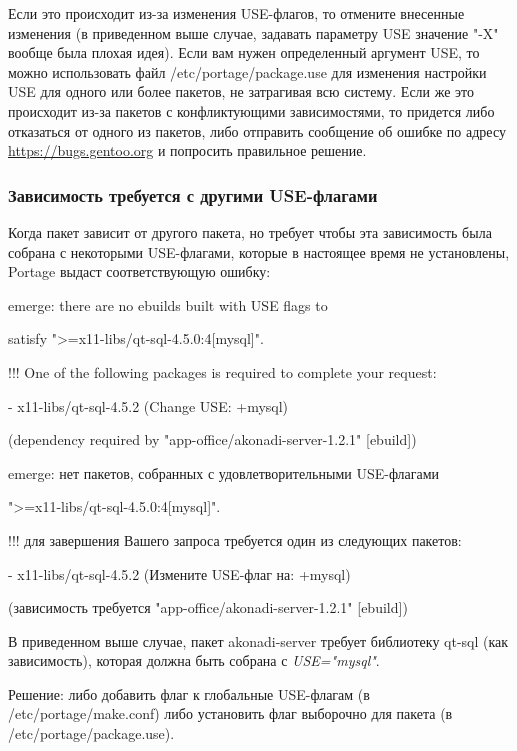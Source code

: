 \documentclass[10pt]{book}
\begin{document}
Если это происходит из-за изменения USE-флагов, то отмените внесенные изменения (в приведенном выше случае, задавать параметру USE значение "-X" вообще была плохая идея). Если вам нужен определенный аргумент USE, то можно использовать файл  /etc/portage/package.use для изменения настройки USE для одного или более пакетов, не затрагивая всю систему. Если же это происходит из-за пакетов с конфликтующими зависимостями, то придется либо отказаться от одного из пакетов, либо отправить сообщение об ошибке по адресу \href{https://bugs.gentoo.org}{https://bugs.gentoo.org} и попросить правильное решение.

\subsubsection{Зависимость требуется с другими USE-флагами}

Когда пакет зависит от другого пакета, но требует чтобы эта зависимость была собрана с некоторыми USE-флагами, которые в настоящее время не установлены, Portage выдаст соответствующую ошибку:

 \begin{tcolorbox}
emerge: there are no ebuilds built with USE flags to

satisfy ">=x11-libs/qt-sql-4.5.0:4[mysql]".

!!! One of the following packages is required to complete your request:

- x11-libs/qt-sql-4.5.2 (Change USE: +mysql)

(dependency required by "app-office/akonadi-server-1.2.1" [ebuild])
\end{tcolorbox}
 \begin{tcolorbox}
emerge: нет пакетов, собранных с удовлетворительными USE-флагами 

">=x11-libs/qt-sql-4.5.0:4[mysql]".

!!! для завершения Вашего запроса требуется один из следующих пакетов:

- x11-libs/qt-sql-4.5.2 (Измените USE-флаг на: +mysql)

(зависимость требуется "app-office/akonadi-server-1.2.1" [ebuild])
\end{tcolorbox}
В приведенном выше случае, пакет  akonadi-server требует библиотеку qt-sql (как зависимость), которая должна быть собрана с \textit{USE="mysql"}. 

Решение: либо добавить флаг к глобальные USE-флагам (в  /etc/portage/make.conf) либо установить флаг выборочно для пакета (в  /etc/portage/package.use).
\end{document}
